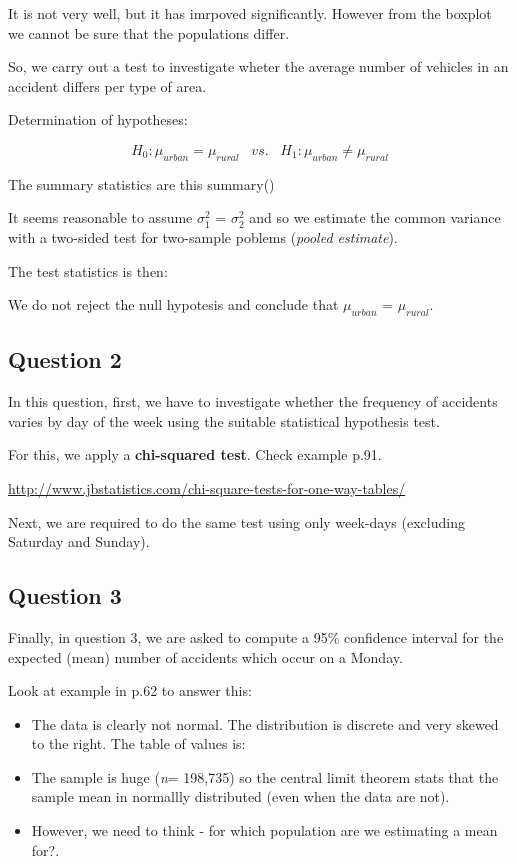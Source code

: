 \documentclass[]{article}
\begin{document}
It is not very well, but it has imrpoved significantly. However from the
boxplot we cannot be sure that the populations differ.

So, we carry out a test to investigate wheter the average number of
vehicles in an accident differs per type of area.

Determination of hypotheses:

\[H_{0}: \mu_{urban} = \mu_{rural}\;\;\;vs.\;\;\;H_{1}: \mu_{urban} \neq \mu_{rural}\]

The summary statistics are this summary()

It seems reasonable to assume \(\sigma_{1}^{2}\) = \(\sigma_{2}^{2}\)
and so we estimate the common variance with a two-sided test for
two-sample poblems (\emph{pooled estimate}).

The test statistics is then:

We do not reject the null hypotesis and conclude that \(\mu_{urban}\) =
\(\mu_{rural}\).

\subsection{Question 2}\label{question-2}

In this question, first, we have to investigate whether the frequency of
accidents varies by day of the week using the suitable statistical
hypothesis test.

For this, we apply a \textbf{chi-squared test}. Check example p.91.

\url{http://www.jbstatistics.com/chi-square-tests-for-one-way-tables/}

Next, we are required to do the same test using only week-days
(excluding Saturday and Sunday).

\subsection{Question 3}\label{question-3}

Finally, in question 3, we are asked to compute a 95\% confidence
interval for the expected (mean) number of accidents which occur on a
Monday.

Look at example in p.62 to answer this:

\begin{itemize}
\item
  The data is clearly not normal. The distribution is discrete and very
  skewed to the right. The table of values is:
\item
  The sample is huge (\emph{n}= 198,735) so the central limit theorem
  stats that the sample mean in normallly distributed (even when the
  data are not).
\item
  However, we need to think - for which population are we estimating a
  mean for?.
\end{itemize}
\end{document}
